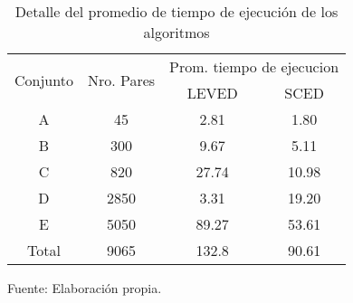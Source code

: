 \begin{table}[H]
\centering
\begin{tabular}{|c|c|cc|}
\hline
\multirow{2}{*}{Conjunto} & \multirow{2}{*}{Nro. Pares} & \multicolumn{2}{c|}{Prom. tiempo de ejecucion}   \\ \cline{3-4}
                          &                             & \multicolumn{1}{c|}{LEVED} & \multicolumn{1}{c|}{SCED} \\ \hline
A                         & 45                          & \multicolumn{1}{c|}{2.81}  & \multicolumn{1}{c|}{1.80}    \\ \hline
B                         & 300                         & \multicolumn{1}{c|}{9.67}  & \multicolumn{1}{c|}{5.11}    \\ \hline
C                         & 820                         & \multicolumn{1}{c|}{27.74}  & \multicolumn{1}{c|}{10.98}  \\ \hline
D                         & 2850                        & \multicolumn{1}{c|}{3.31}  & \multicolumn{1}{c|}{19.20}   \\ \hline
E                         & 5050                        & \multicolumn{1}{c|}{89.27} & \multicolumn{1}{c|}{53.61} \\ \hline
Total                     & 9065                        & \multicolumn{1}{c|}{132.8} & \multicolumn{1}{c|}{90.61}  \\ \hline
\end{tabular}
\caption{Detalle del promedio de tiempo de ejecución de los algoritmos}
Fuente: Elaboración propia.
\label{pruebaTiempoV}
\end{table}
